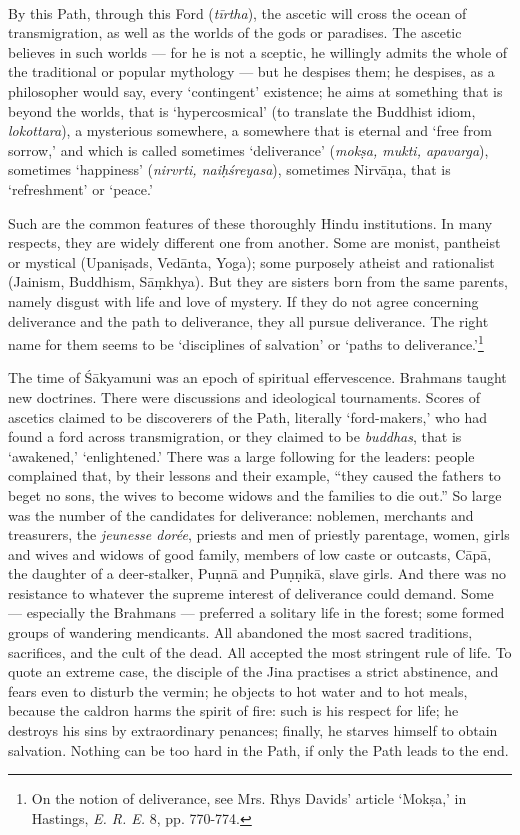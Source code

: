 \documentclass[a4paper, 11pt, oneside, english]{article}
\begin{document}
\paragraph{}
By this Path, through this Ford (\emph{tīrtha}), the ascetic will cross the ocean of transmigration, as well as the worlds of the gods or paradises. The ascetic believes in such worlds --- for he is not a sceptic, he willingly admits the whole of the traditional or popular mythology --- but he despises them; he despises, as a philosopher would say, every `contingent' existence; he aims at something that is beyond the worlds, that is `hypercosmical' (to translate the Buddhist idiom, \emph{lokottara}), a mysterious somewhere, a somewhere that is eternal and `free from sorrow,' and which is called sometimes `deliverance' (\emph{mokṣa, mukti, apavarga}), sometimes `happiness' (\emph{nirvrti, naiḥśreyasa}), sometimes Nirvāṇa, that is `refreshment' or `peace.'

Such are the common features of these thoroughly Hindu institutions. In many respects, they are widely different one from another. Some are monist, pantheist or mystical (Upaniṣads, Vedānta, Yoga); some purposely atheist and rationalist (Jainism, Buddhism, Sāṃkhya). But they are sisters born from the same parents, namely disgust with life and love of mystery. If they do not agree concerning deliverance and the path to deliverance, they all pursue deliverance. The right name for them seems to be `disciplines of salvation' or `paths to deliverance.'\footnote{On the notion of deliverance, see Mrs. Rhys Davids' article `Mokṣa,' in Hastings, \emph{E. R. E.} 8, pp. 770-774.}

The time of Śākyamuni was an epoch of spiritual effervescence. Brahmans taught new doctrines. There were discussions and ideological tournaments. Scores of ascetics claimed to be discoverers of the Path, literally `ford-makers,' who had found a ford across transmigration, or they claimed to be \emph{buddhas}, that is `awakened,' `enlightened.' There was a large following for the leaders: people complained that, by their lessons and their example, ``they caused the fathers to beget no sons, the wives to become widows and the families to die out.'' So large was the number of the candidates for deliverance: noblemen, merchants and treasurers, the \emph{jeunesse dorée}, priests and men of priestly parentage, women, girls and wives and widows of good family, members of low caste or outcasts, Cāpā, the daughter of a deer-stalker, Puṇnā and Puṇṇikā, slave girls. And there was no resistance to whatever the supreme interest of deliverance could demand. Some --- especially the Brahmans --- preferred a solitary life in the forest; some formed groups of wandering mendicants. All abandoned the most sacred traditions, sacrifices, and the cult of the dead. All accepted the most stringent rule of life. To quote an extreme case, the disciple of the Jina practises a strict abstinence, and fears even to disturb the vermin; he objects to hot water and to hot meals, because the caldron harms the spirit of fire: such is his respect for life; he destroys his sins by extraordinary penances; finally, he starves himself to obtain salvation. Nothing can be too hard in the Path, if only the Path leads to the end.
\end{document}
